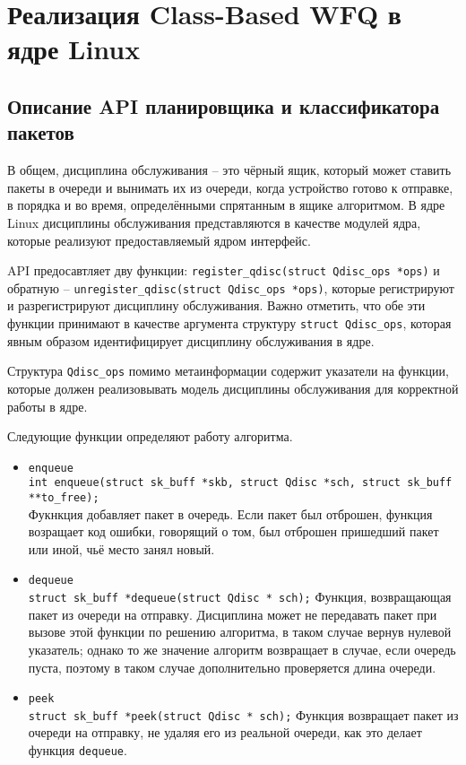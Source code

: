 \section{Реализация Class-Based WFQ в ядре Linux}

	\subsection{Описание API планировщика и классификатора пакетов}

	В общем, дисциплина обслуживания -- это чёрный ящик, который может
	ставить пакеты в очереди и вынимать их из очереди, когда устройство
	готово к отправке, в порядка и во время, определёнными спрятанным в ящике
	алгоритмом. В ядре Linux дисциплины обслуживания представляются в качестве
	модулей ядра, которые реализуют предоставляемый ядром интерфейс.

	API предосавтляет дву функции: \lstinline{register_qdisc(struct Qdisc_ops *ops)}
	и обратную -- \lstinline{unregister_qdisc(struct Qdisc_ops *ops)}, которые регистрируют
	и разрегистрируют дисциплину обслуживания. Важно отметить, что обе эти
	функции принимают в качестве аргумента структуру \lstinline{struct Qdisc_ops},
	которая явным образом идентифицирует дисциплину обслуживания в ядре.

	Структура \texttt{Qdisc\_ops} помимо метаинформации содержит указатели на функции,
	которые должен реализовывать модель дисциплины обслуживания для корректной
	работы в ядре. 

	Следующие функции определяют работу алгоритма.
	\begin{itemize}
		\item \lstinline{enqueue}\\
   		    \lstinline{int enqueue(struct sk_buff *skb, struct Qdisc *sch, struct sk_buff **to_free);} \\
			Фукнкция добавляет пакет в очередь. Если пакет был отброшен, функция
			возращает код ошибки, говорящий о том, был отброшен пришедший пакет или
			иной, чьё место занял новый.
		\item \lstinline{dequeue}\\
			\lstinline{struct sk_buff *dequeue(struct Qdisc * sch);}
			Функция, возвращающая пакет из очереди на отправку. Дисциплина
			может не передавать пакет при вызове этой функции по решению
			алгоритма, в таком случае вернув нулевой указатель; 
			однако то же значение алгоритм возвращает в случае, если очередь
			пуста, поэтому в таком случае дополнительно проверяется длина
			очереди.
		\item \lstinline{peek}\\
			\lstinline{struct sk_buff *peek(struct Qdisc * sch);}
			Функция возвращает пакет из очереди на отправку, не удаляя его из реальной очереди,
			как это делает функция \lstinline{dequeue}.
	\end{itemize}

